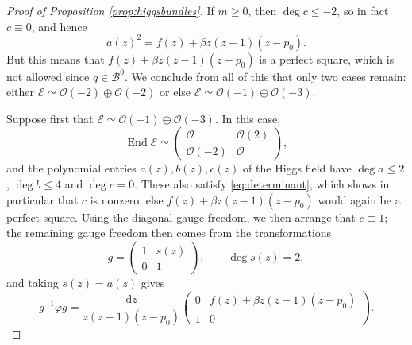 \documentclass[12pt,letterpaper,reqno]{amsart}
\theoremstyle{remark}
\theoremstyle{definition}
\numberwithin{thm}{section}
\numberwithin{equation}{section}
\numberwithin{figure}{section}
\newcommand{\cO}{\ensuremath{\mathcal O}}
\newcommand{\cE}{{\mathcal E}}
\newcommand{\de}{\mathrm{d}}
\DeclareMathOperator{\End}{End}
\begin{document}
\begin{proof}[Proof of Proposition \ref{prop:higgsbundles}]
If $m \geq 0$, then $\deg c\leq -2$, so in fact $c \equiv 0$, and hence
\begin{equation}
 a(z)^2 =f(z) + \beta z(z-1)(z-p_0).
\end{equation}
But this means that $f(z) + \beta z(z-1)(z-p_0)$ is a perfect square, which is not allowed since $q \in \mathcal{B}^0$.
We conclude from all of this that only two cases remain: either $\cE \simeq \cO(-2) \oplus \cO(-2)$ or else $\cE \simeq \cO(-1) \oplus \cO(-3)$.

\smallskip

Suppose first that $\cE \simeq \cO(-1) \oplus \cO(-3)$. In this case, 
\begin{equation}
\End \cE \simeq \begin{pmatrix} \cO & \cO(2) \\ \cO(-2) & \cO \end{pmatrix},
\end{equation}
and the polynomial entries $a(z), b(z), c(z)$ of the Higgs field have $\deg a \leq 2$, $\deg b \leq 4$ and $\deg c =0$. These also satisfy
\eqref{eq:determinant}, which shows in particular that $c$ is nonzero, else $f(z) + \beta z(z-1)(z-p_0)$ would again be a perfect square. 
Using the diagonal gauge freedom, we then arrange that $c \equiv 1$; the remaining gauge freedom then comes from the transformations
\begin{equation}
 g=\begin{pmatrix} 1 & s(z) \\ 0 & 1 \end{pmatrix}, \qquad \deg s(z) =2,
\end{equation}
and taking $s(z) = a(z)$ gives
\begin{equation}
 g^{-1} \varphi g = \frac{\de z}{z(z-1)(z-p_0)}\begin{pmatrix} 0 & f(z) + \beta z (z-1)(z-p_0) \\ 1 & 0 \end{pmatrix}.
\end{equation}

\smallskip


\end{proof}
\end{document}
